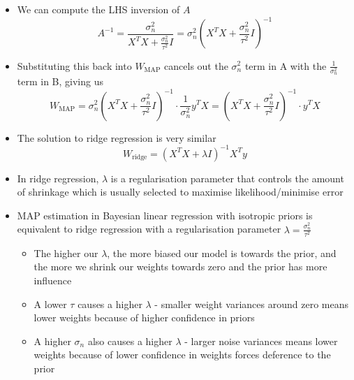 \documentclass[12pt]{article}
\begin{document}
\begin{itemize}
\begin{equation}
\end{equation}
    \item We can compute the LHS inversion of $A$
\begin{equation}
    A^{-1} = \frac{\sigma_n^2}{X^TX + \frac{\sigma_n^2}{\tau^2}I} = \sigma_n^2\left(X^TX + \frac{\sigma_n^2}{\tau^2}I\right)^{-1}
\end{equation}
    \item Substituting this back into $W_\text{MAP}$ cancels out the $\sigma_n^2$ term in A with the $\frac{1}{\sigma_n^2}$ term in B, giving us
\begin{equation}
    W_{\text{MAP}} = \sigma_n^2\left(X^TX + \frac{\sigma_n^2}{\tau^2}I\right)^{-1} \cdot \frac{1}{\sigma_n^2}y^TX = \left(X^TX + \frac{\sigma_n^2}{\tau^2}I\right)^{-1} \cdot y^TX
\end{equation}
    \item The solution to ridge regression is very similar
\begin{equation}
    W_{\text{ridge}} = \left(X^TX + \lambda I\right)^{-1}X^Ty
\end{equation}
    \item In ridge regression, $\lambda$ is a regularisation parameter that controls the amount of shrinkage which is usually selected to maximise likelihood/minimise error
    \item MAP estimation in Bayesian linear regression with isotropic priors is equivalent to ridge regression with a regularisation parameter $\lambda = \frac{\sigma_n^2}{\tau^2}$
        \begin{itemize}
            \item The higher our $\lambda$, the more biased our model is towards the prior, and the more we shrink our weights towards zero and the prior has more influence
            \item A lower $\tau$ causes a higher $\lambda$ - smaller weight variances around zero means lower weights because of higher confidence in priors
            \item A higher $\sigma_n$ also causes a higher $\lambda$ - larger noise variances means lower weights because of lower confidence in weights forces deference to the prior
        \end{itemize}
\end{itemize}
\end{document}
